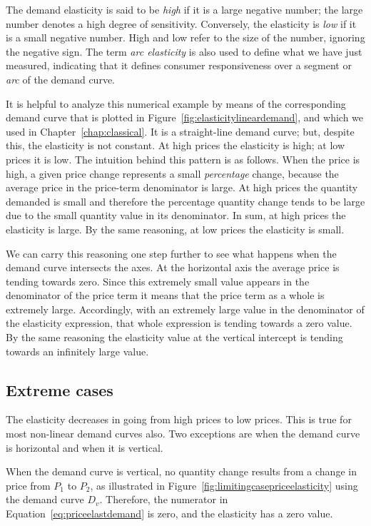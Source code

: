 The demand elasticity is said to be \textit{high} if it is a large negative
number; the large number denotes a high degree of sensitivity. Conversely,
the elasticity is \textit{low} if it is a small negative number. High and
low refer to the size of the number, ignoring the negative sign. The term
\textit{arc elasticity} is also used to define what we have just
measured, indicating that it defines consumer responsiveness over a segment
or \textit{arc} of the demand curve.

It is helpful to analyze this numerical example by means of the
corresponding demand curve that is plotted in Figure~\ref{fig:elasticitylineardemand},
and which we used in Chapter~\ref{chap:classical}. It is a
straight-line demand curve; but, despite this, the elasticity is not
constant. At high prices the elasticity is high; at low prices it is low.
The intuition behind this pattern is as follows. When the price is high, a
given price change represents a small \textit{percentage} change, because
the average price in the price-term denominator is large. At high prices the
quantity demanded is small and therefore the percentage quantity change
tends to be large due to the small quantity value in its denominator. In
sum, at high prices the elasticity is large. By the same reasoning, at low
prices the elasticity is small.

We can carry this reasoning one step further to see what happens when the
demand curve intersects the axes. At the horizontal axis the average price
is tending towards zero. Since this extremely small value appears in the
denominator of the price term it means that the price term as a whole is
extremely large. Accordingly, with an extremely large value in the
denominator of the elasticity expression, that whole expression is tending
towards a zero value. By the same reasoning the elasticity value at the
vertical intercept is tending towards an infinitely large value.

\newhtmlpage

\subsection*{Extreme cases}

The elasticity decreases in going from high prices to low prices. This is
true for most non-linear demand curves also. Two exceptions are when the
demand curve is horizontal and when it is vertical.

When the demand curve is vertical, no quantity change results from a change
in price from $P_1$ to $P_2$, as illustrated in Figure~\ref{fig:limitingcasepriceelasticity}
using the demand curve $D_v$.
Therefore, the numerator in Equation~\ref{eq:priceelastdemand} is zero,
and the elasticity has a zero value.


